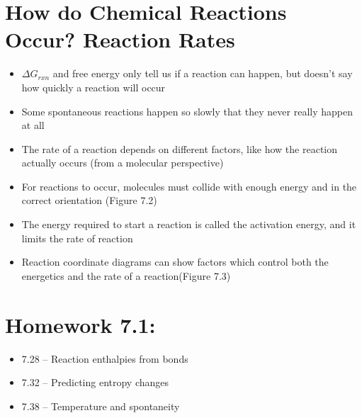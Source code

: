 \documentclass[12pt, openany, letterpaper]{memoir}
\begin{document}
\section{How do Chemical Reactions Occur? Reaction Rates}
\begin{itemize}
	\item $\Delta G_{rxn}$ and free energy only tell us if a reaction can happen, but doesn't say how quickly a reaction will occur
	\item Some spontaneous reactions happen so slowly that they never really happen at all
	\item The rate of a reaction depends on different factors, like how the reaction actually occurs (from a molecular perspective)
	\item For reactions to occur, molecules must collide with enough energy and in the correct orientation (Figure 7.2)
	\item The energy required to start a reaction is called the activation energy, and it limits the rate of reaction
	\item Reaction coordinate diagrams can show factors which control both the energetics and the rate of a reaction(Figure 7.3)
\end{itemize}

\section*{Homework 7.1:}
\begin{itemize}
  \item 7.28 -- Reaction enthalpies from bonds
  \item 7.32 -- Predicting entropy changes
  \item 7.38 -- Temperature and spontaneity
\end{itemize}
\end{document}
